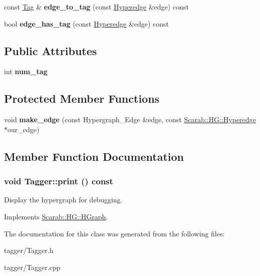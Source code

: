 \begin{DoxyCompactItemize}
\item 
\hypertarget{classTagger_ad615c8356f380baab01ae6675a25c409}{
const \hyperlink{structTag}{Tag} \& {\bfseries edge\_\-to\_\-tag} (const \hyperlink{classScarab_1_1HG_1_1Hyperedge}{Hyperedge} \&edge) const }
\label{classTagger_ad615c8356f380baab01ae6675a25c409}

\item 
\hypertarget{classTagger_ad7f1dda6082e71cd113a3d77e9c33275}{
bool {\bfseries edge\_\-has\_\-tag} (const \hyperlink{classScarab_1_1HG_1_1Hyperedge}{Hyperedge} \&edge) const }
\label{classTagger_ad7f1dda6082e71cd113a3d77e9c33275}

\end{DoxyCompactItemize}
\subsection*{Public Attributes}
\begin{DoxyCompactItemize}
\item 
\hypertarget{classTagger_a4bf3332c608c078cbb2d5692c4f13b43}{
int {\bfseries num\_\-tag}}
\label{classTagger_a4bf3332c608c078cbb2d5692c4f13b43}

\end{DoxyCompactItemize}
\subsection*{Protected Member Functions}
\begin{DoxyCompactItemize}
\item 
\hypertarget{classTagger_a305fd4cf75f2149a57109772e195eb47}{
void {\bfseries make\_\-edge} (const Hypergraph\_\-Edge \&edge, const \hyperlink{classScarab_1_1HG_1_1Hyperedge}{Scarab::HG::Hyperedge} $\ast$our\_\-edge)}
\label{classTagger_a305fd4cf75f2149a57109772e195eb47}

\end{DoxyCompactItemize}


\subsection{Member Function Documentation}
\hypertarget{classTagger_a4ebe0aebd7c0392970b401a5a6c6cd72}{
\subsubsection[{print}]{\setlength{\rightskip}{0pt plus 5cm}void Tagger::print () const}}
\label{classTagger_a4ebe0aebd7c0392970b401a5a6c6cd72}
Display the hypergraph for debugging. 

Implements \hyperlink{classScarab_1_1HG_1_1HGraph_ab5aa11c932b28864b56f28e0babbc1c1}{Scarab::HG::HGraph}.



The documentation for this class was generated from the following files:\begin{DoxyCompactItemize}
\item 
tagger/Tagger.h\item 
tagger/Tagger.cpp\end{DoxyCompactItemize}
